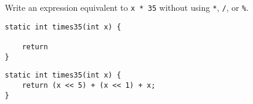 \question Write an expression equivalent to \texttt{x * 35} without using \texttt{*}, \texttt{/}, or \texttt{\%}.

\ifprintanswers\else
\begin{lstlisting}
static int times35(int x) {

    return
}
\end{lstlisting}
\fi

\begin{solution}
\begin{lstlisting}
static int times35(int x) {
    return (x << 5) + (x << 1) + x;
}
\end{lstlisting}
\end{solution}